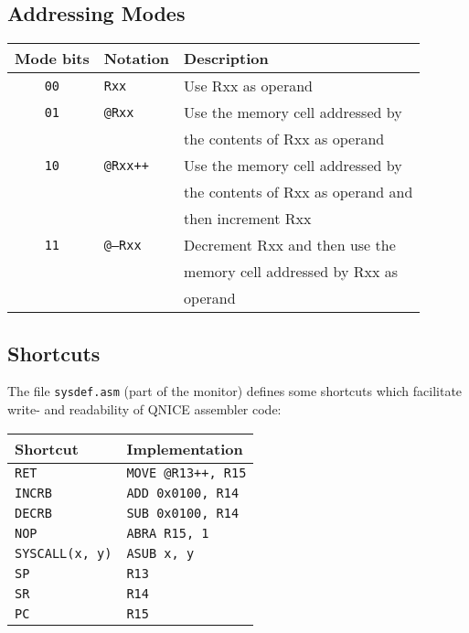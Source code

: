 \documentclass{leaflet}
\begin{document}
  \subsection{Addressing Modes}
   {\scriptsize
    \begin{center}
     \begin{longtable}{|c|l|l|}
      \hline
       Mode bits&Notation&Description\\
      \hline
      \hline
       {\tt 00}&{\tt Rxx}&Use Rxx as operand\\
       {\tt 01}&{\tt @Rxx}&Use the memory cell addressed by\\
               &          &the contents of Rxx as operand\\
       {\tt 10}&{\tt @Rxx++}&Use the memory cell addressed by\\
               &          &the contents of Rxx as operand and\\
               &          &then increment Rxx\\
       {\tt 11}&{\tt @--Rxx}&Decrement Rxx and then use the\\
               &          &memory cell addressed by Rxx as\\
               &          &operand\\
      \hline
     \end{longtable}
    \end{center}
   }
   \vspace*{-15mm}
%
  \subsection{Shortcuts}
   The file \texttt{sysdef.asm} (part of the monitor) defines some shortcuts
   which facilitate write- and readability of QNICE assembler code:
   \vspace*{-3mm}
   \begin{center}
    \begin{longtable}{|l|l|}
     \hline
      Shortcut&Implementation\\
     \hline
     \hline
      \texttt{RET}&\texttt{MOVE @R13++, R15}\\
      \texttt{INCRB}&\texttt{ADD 0x0100, R14}\\
      \texttt{DECRB}&\texttt{SUB 0x0100, R14}\\
      \texttt{NOP}&\texttt{ABRA R15, 1}\\
      \texttt{SYSCALL(x, y)}&\texttt{ASUB x, y}\\
     \hline
      \texttt{SP}&\texttt{R13}\\
      \texttt{SR}&\texttt{R14}\\
      \texttt{PC}&\texttt{R15}\\
     \hline
    \end{longtable}
   \end{center}
   \vspace*{-15mm}
%
\end{document}
